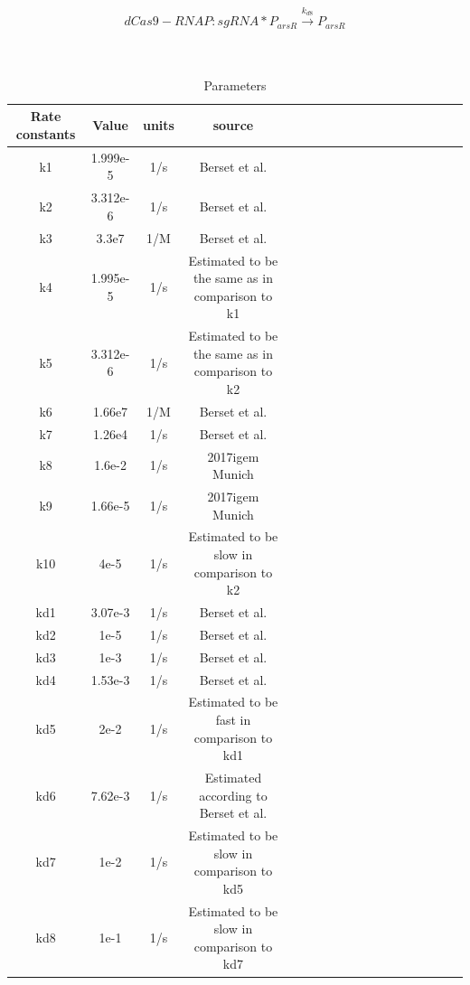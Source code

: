
\begin{equation}
dCas9-RNAP:sgRNA*P_{arsR}\stackrel{k_{d8}}{\longrightarrow}P_{arsR}
\end{equation}
\\\\
\begin{table}[htbp]
	\centering
	\caption{\label {tab:test} Parameters}
	\begin{tabular}{cccccccccccccccccc}
		\toprule
		Rate constants & Value& units & source \\
		\midrule
		k1 & 1.999e-5 &1/s & Berset et al. \\
		k2 & 3.312e-6 &1/s & Berset et al.\\
		k3 & 3.3e7    & 1/M &Berset et al.   \\
		k4 &1.995e-5 &1/s & Estimated to be the same as in comparison to k1\\
		k5 & 3.312e-6 &1/s&Estimated to be the same as in comparison to k2\\
		k6 &1.66e7   &1/M & Berset et al.  \\
		k7  &1.26e4 &1/s & Berset et al. \\
		k8&1.6e-2& 1/s & 2017igem Munich\\
		k9 &1.66e-5&1/s&  2017igem Munich\\ 
		k10&4e-5&1/s & Estimated to be slow in comparison to k2 \\
		kd1 & 3.07e-3&1/s & Berset et al.\\
		kd2&1e-5&1/s & Berset et al.\\
		kd3&1e-3&1/s  & Berset et al.\\
		kd4&1.53e-3&1/s  & Berset et al.\\
		kd5 & 2e-2&1/s & Estimated to be fast in comparison to kd1\\
		kd6&7.62e-3&1/s&  Estimated according to Berset et al.\\
		kd7& 1e-2&1/s&  Estimated to be slow in comparison to kd5\\
		kd8&1e-1&1/s&  Estimated to be slow in comparison to kd7\\		
		\bottomrule
	\end{tabular}
\end{table}



